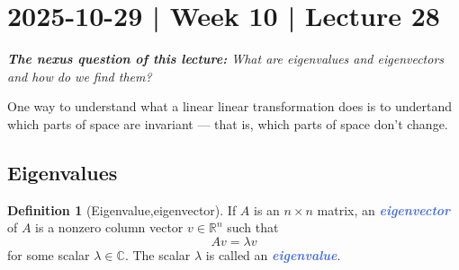 \documentclass[10pt]{article}
\newcommand{\demph}[1]{\textcolor{RoyalBlue}{\textbf{\slshape #1}}} %
\theoremstyle{definition}
\newtheorem{definition}[theorem]{Definition}
\newcommand{\R}{\mathbb{R}}           %
\newcommand{\C}{\mathbb{C}}           %
\begin{document}
\newpage
\section{2025-10-29 | Week 10 | Lecture 28}
\begin{center}
  \begin{tcolorbox}[width=0.9\textwidth, colback=white, colframe=black]
    \textit{\textbf{The nexus question of this lecture:} What are eigenvalues
      and eigenvectors and how do we find them?}
  \end{tcolorbox}
\end{center}

One way to understand what a linear linear transformation does is to undertand
which parts of space are invariant --- that is, which parts of space don't
change. 

\subsection{Eigenvalues}


\begin{definition}[Eigenvalue,eigenvector]
  \label{def:eigenvalue-eigenvector}
  If $A$ is an $n\times n$ matrix, an \demph{eigenvector} of $A$ is a nonzero
  column vector $v\in \R^{n}$ such that
  \begin{equation*}
    Av=\lambda v
  \end{equation*}
  for some scalar $\lambda\in \C$. The scalar $\lambda$ is called an \demph{eigenvalue}.
\end{definition}
\end{document}
